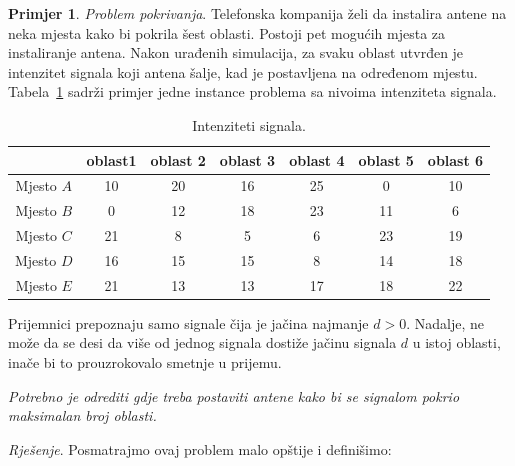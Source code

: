 \documentclass[b5paper, utf8, 11pt, colorlinks]{book}
\theoremstyle{definition}
\newtheorem{primjer}{Primjer}[chapter]
\begin{document}
\begin{primjer}
	
	\emph{Problem pokrivanja}. Telefonska kompanija želi da instalira antene na neka mjesta kako bi pokrila šest oblasti. Postoji pet mogućih mjesta za instaliranje antena. Nakon urađenih simulacija, za svaku oblast utvrđen je intenzitet signala koji antena šalje, kad je postavljena na određenom mjestu. Tabela~\ref{tab:tb-3} sadrži   primjer jedne instance problema sa nivoima intenziteta signala.
	
	\begin{table}[!ht]
		\centering
		\begin{tabular}{c|cccccc} \hline
			\              & oblast1 & oblast 2 & oblast 3 & oblast 4 & oblast 5 & oblast 6 \\ \hline
			Mjesto $A$     & 10  & 20 & 16 & 25 & 0   & 10   \\
			Mjesto $B$     & 0   & 12 & 18 &  23 & 11 & 6   \\
			Mjesto $C$     & 21  &  8 & 5  &  6 & 23  &  19 \\
			Mjesto $D$    &  16 &  15 & 15 &  8 & 14 & 18   \\
			Mjesto $E $    &  21 & 13 & 13 & 17 & 18  & 22    \\ \hline
		\end{tabular}
		\caption{Intenziteti signala.}
		\label{tab:tb-3}
	\end{table}
	
	Prijemnici prepoznaju samo signale čija je jačina najmanje   $d>0$. Nadalje, ne može da se desi da više od jednog signala  dostiže jačinu signala $d$ u istoj oblasti, inače bi to prouzrokovalo smetnje u prijemu. %
	
	\emph{Potrebno je odrediti gdje treba postaviti antene kako bi se signalom pokrio maksimalan broj oblasti.}
\end{primjer}
\emph{Rješenje}. Posmatrajmo ovaj problem malo opštije i definišimo: 
\end{document}
